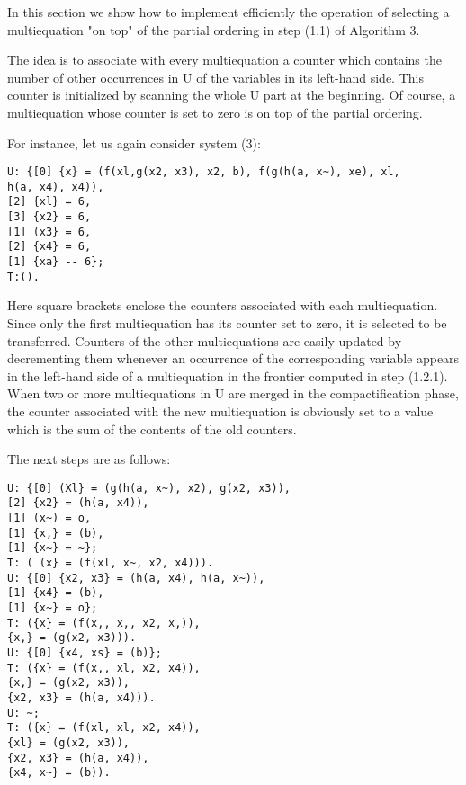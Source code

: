 \label{mmalg4}

In this section we show how to implement efficiently the operation of selecting a
multiequation "on top" of the partial ordering in step (1.1) of Algorithm 3. 

The idea is to associate with every multiequation a counter which contains the
number of other occurrences in U of the variables in its left-hand side. This
counter is initialized by scanning the whole U part at the beginning. Of course, a
multiequation whose counter is set to zero is on top of the partial ordering. 

For instance, let us again consider system (3):
\begin{verbatim}
U: {[0] {x} = (f(xl,g(x2, x3), x2, b), f(g(h(a, x~), xe), xl,
h(a, x4), x4)),
[2] {xl} = 6,
[3] {x2} = 6,
[1] (x3} = 6,
[2] {x4} = 6,
[1] {xa} -- 6};
T:(). 
\end{verbatim}

Here square brackets enclose the counters associated with each multiequation.
Since only the first multiequation has its counter set to zero, it is selected to be
transferred. Counters of the other multiequations are easily updated by 
decrementing them whenever an occurrence of the corresponding variable appears in
the left-hand side of a multiequation in the frontier computed in step (1.2.1).
When two or more multiequations in U are merged in the compactification phase,
the counter associated with the new multiequation is obviously set to a value
which is the sum of the contents of the old counters. 

The next steps are as follows:
\begin{verbatim}
U: {[0] (Xl} = (g(h(a, x~), x2), g(x2, x3)),
[2] {x2} = (h(a, x4)),
[1] (x~) = o,
[1] {x,} = (b),
[1] {x~} = ~};
T: ( (x} = (f(xl, x~, x2, x4))).
U: {[0] {x2, x3} = (h(a, x4), h(a, x~)),
[1] {x4} = (b),
[1] {x~} = o};
T: ({x} = (f(x,, x,, x2, x,)),
{x,} = (g(x2, x3))).
U: {[0] {x4, xs} = (b)};
T: ({x} = (f(x,, xl, x2, x4)),
{x,} = (g(x2, x3)),
{x2, x3} = (h(a, x4))).
U: ~;
T: ({x} = (f(xl, xl, x2, x4)),
{xl} = (g(x2, x3)),
{x2, x3} = (h(a, x4)),
{x4, x~} = (b)). 
\end{verbatim}
